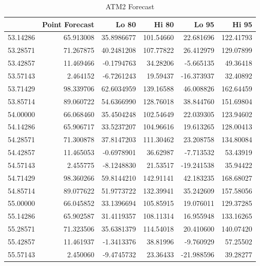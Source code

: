 \documentclass[openany]{book}
\begin{document}
\begin{table}[H]

\caption{\label{tab:unnamed-chunk-11}ATM2 Forecast}
\centering
\begin{tabular}{l|r|r|r|r|r}
\hline
\textbf{ } & \textbf{Point Forecast} & \textbf{Lo 80} & \textbf{Hi 80} & \textbf{Lo 95} & \textbf{Hi 95}\\
\hline
\rowcolor{gray!6}  53.14286 & 65.913008 & 35.8986677 & 101.54660 & 22.681696 & 122.41793\\
\hline
53.28571 & 71.267875 & 40.2481208 & 107.77822 & 26.412979 & 129.07899\\
\hline
\rowcolor{gray!6}  53.42857 & 11.469466 & -0.1794763 & 34.28206 & -5.665135 & 49.36418\\
\hline
53.57143 & 2.464152 & -6.7261243 & 19.59437 & -16.373937 & 32.40892\\
\hline
\rowcolor{gray!6}  53.71429 & 98.339706 & 62.6034959 & 139.16588 & 46.008826 & 162.64459\\
\hline
53.85714 & 89.060722 & 54.6366990 & 128.76018 & 38.844760 & 151.69804\\
\hline
\rowcolor{gray!6}  54.00000 & 66.068460 & 35.4504248 & 102.54649 & 22.039305 & 123.94602\\
\hline
54.14286 & 65.906717 & 33.5237207 & 104.96616 & 19.613265 & 128.00413\\
\hline
\rowcolor{gray!6}  54.28571 & 71.300878 & 37.8147203 & 111.30462 & 23.208758 & 134.80084\\
\hline
54.42857 & 11.465053 & -0.6978901 & 36.62987 & -7.713532 & 53.43919\\
\hline
\rowcolor{gray!6}  54.57143 & 2.455775 & -8.1248830 & 21.53517 & -19.241538 & 35.94422\\
\hline
54.71429 & 98.360266 & 59.8144210 & 142.91141 & 42.183235 & 168.68027\\
\hline
\rowcolor{gray!6}  54.85714 & 89.077622 & 51.9773722 & 132.39941 & 35.242609 & 157.58056\\
\hline
55.00000 & 66.045852 & 33.1396694 & 105.85915 & 19.076011 & 129.37285\\
\hline
\rowcolor{gray!6}  55.14286 & 65.902587 & 31.4119357 & 108.11314 & 16.955948 & 133.16265\\
\hline
55.28571 & 71.323506 & 35.6381379 & 114.54018 & 20.410600 & 140.07420\\
\hline
\rowcolor{gray!6}  55.42857 & 11.461937 & -1.3413376 & 38.81996 & -9.760929 & 57.25502\\
\hline
55.57143 & 2.450060 & -9.4745732 & 23.36433 & -21.988596 & 39.28277\\

\end{tabular}
\end{table}
\end{document}
